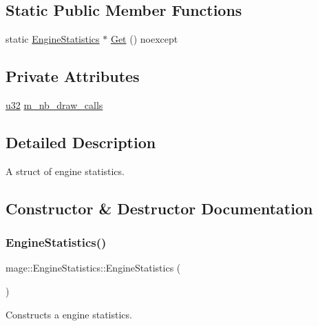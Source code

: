 \subsection*{Static Public Member Functions}
\begin{DoxyCompactItemize}
\item 
static \hyperlink{structmage_1_1_engine_statistics}{Engine\+Statistics} $\ast$ \hyperlink{structmage_1_1_engine_statistics_a7eb0d3a988676f71eea8e9f26ab07f42}{Get} () noexcept
\end{DoxyCompactItemize}
\subsection*{Private Attributes}
\begin{DoxyCompactItemize}
\item 
\hyperlink{namespacemage_af2b398bf98eb10351f49cad73fe2cc73}{u32} \hyperlink{structmage_1_1_engine_statistics_af8bf29c544ccd3366b531231908218a4}{m\+\_\+nb\+\_\+draw\+\_\+calls}
\end{DoxyCompactItemize}


\subsection{Detailed Description}
A struct of engine statistics. 

\subsection{Constructor \& Destructor Documentation}
\hypertarget{structmage_1_1_engine_statistics_acbaa39e0e0ee0d6cb5c8d174bb80a3fd}{}\label{structmage_1_1_engine_statistics_acbaa39e0e0ee0d6cb5c8d174bb80a3fd} 
\subsubsection{\texorpdfstring{Engine\+Statistics()}{EngineStatistics()}\hspace{0.1cm}{\footnotesize\ttfamily [1/3]}}
{\footnotesize\ttfamily mage\+::\+Engine\+Statistics\+::\+Engine\+Statistics (\begin{DoxyParamCaption}{ }\end{DoxyParamCaption})}

Constructs a engine statistics. \hypertarget{structmage_1_1_engine_statistics_a8361fa991298c7669b4e3c8262acff60}{}\label{structmage_1_1_engine_statistics_a8361fa991298c7669b4e3c8262acff60} 
